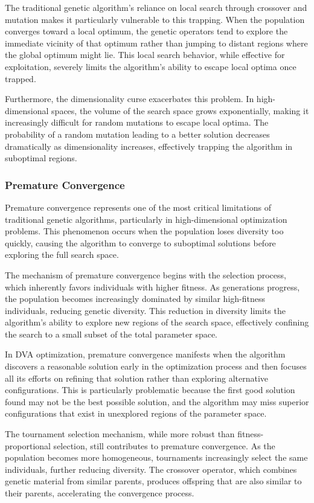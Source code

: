 \documentclass[12pt,a4paper]{article}
\begin{document}
The traditional genetic algorithm's reliance on local search through crossover and mutation makes it particularly vulnerable to this trapping. When the population converges toward a local optimum, the genetic operators tend to explore the immediate vicinity of that optimum rather than jumping to distant regions where the global optimum might lie. This local search behavior, while effective for exploitation, severely limits the algorithm's ability to escape local optima once trapped.

Furthermore, the dimensionality curse exacerbates this problem. In high-dimensional spaces, the volume of the search space grows exponentially, making it increasingly difficult for random mutations to escape local optima. The probability of a random mutation leading to a better solution decreases dramatically as dimensionality increases, effectively trapping the algorithm in suboptimal regions.

\subsubsection{Premature Convergence}

Premature convergence represents one of the most critical limitations of traditional genetic algorithms, particularly in high-dimensional optimization problems. This phenomenon occurs when the population loses diversity too quickly, causing the algorithm to converge to suboptimal solutions before exploring the full search space.

The mechanism of premature convergence begins with the selection process, which inherently favors individuals with higher fitness. As generations progress, the population becomes increasingly dominated by similar high-fitness individuals, reducing genetic diversity. This reduction in diversity limits the algorithm's ability to explore new regions of the search space, effectively confining the search to a small subset of the total parameter space.

In DVA optimization, premature convergence manifests when the algorithm discovers a reasonable solution early in the optimization process and then focuses all its efforts on refining that solution rather than exploring alternative configurations. This is particularly problematic because the first good solution found may not be the best possible solution, and the algorithm may miss superior configurations that exist in unexplored regions of the parameter space.

The tournament selection mechanism, while more robust than fitness-proportional selection, still contributes to premature convergence. As the population becomes more homogeneous, tournaments increasingly select the same individuals, further reducing diversity. The crossover operator, which combines genetic material from similar parents, produces offspring that are also similar to their parents, accelerating the convergence process.
\end{document}
